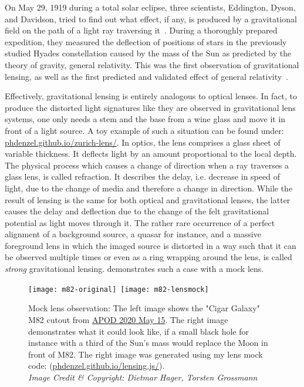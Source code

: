 
On May 29, 1919 during a total solar eclipse, three scientists, Eddington,
Dyson, and Davidson, tried to find out what effect, if any, is produced by a
gravitational field on the path of a light ray traversing
it~\cite{Eddington1920}.  During a thoroughly prepared expedition, they measured
the deflection of positions of stars in the previously studied Hyades
constellation caused by the mass of the Sun as predicted by the theory of
gravity, general relativity.  This was the first observation of gravitational
lensing, as well as the first predicted and validated effect of general
relativity~.

Effectively, gravitational lensing is entirely analogous to optical lenses. In
fact, to produce the distorted light signatures like they are observed in
gravitational lens systems, one only needs a stem and the base from a wine glass
and move it in front of a light source.  A toy example of such a situation can
be found under:
\href{https://phdenzel.github.io/zurich-lens/}{phdenzel.github.io/zurich-lens/}.
In optics, the lens comprises a glass sheet of variable thickness.  It deflects
light by an amount proportional to the local depth.  The physical process which
causes a change of direction when a ray traverses a glass lens, is called
refraction.  It describes the delay, i.e. decrease in speed of light, due to the
change of media and therefore a change in direction.  While the result of
lensing is the same for both optical and gravitational lenses, the latter causes
the delay and deflection due to the change of the felt gravitational potential
as light moves through it.  The rather rare occurrence of a perfect alignment of
a background source, a quasar for instance, and a massive foreground lens in
which the imaged source is distorted in a way such that it can be observed
multiple times or even as a ring wrapping around the lens, is called
\textit{strong} gravitational lensing.   demonstrates such a
case with a mock lens.
\begin{figure}[h]
    \centering
    \texttt{[image: m82-original]}\,%
    \texttt{[image: m82-lensmock]}
    \caption[Mock lens image of M82]{Mock lens observation: The left image shows
      the "Cigar Galaxy" M82 cutout from
      \href{https://apod.nasa.gov/apod/ap200515.html}{APOD 2020 May 15}. The
      right image demonstrates what it could look like, if a small black hole
      for instance with a third of the Sun's mass would replace the Moon in
      front of M82.  The right image was generated using my lens mock code:
      (\href{https://phdenzel.github.io/lensing.js/}{phdenzel.github.io/lensing.js/}).\\
      \textit{Image Credit \& Copyright: Dietmar Hager, Torsten
        Grossmann}}
\end{figure}

